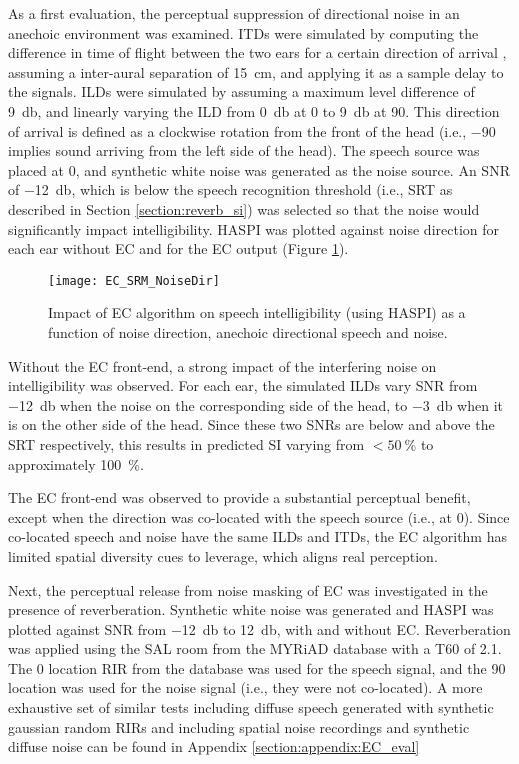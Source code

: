 As a first evaluation, the perceptual suppression of directional noise in an anechoic environment was examined. ITDs were simulated by computing the difference in time of flight between the two ears for a certain direction of arrival , assuming a inter-aural separation of \qty{15}{\centi\metre}, and applying it as a sample delay to the signals. ILDs were simulated by assuming a maximum level difference of \qty{9}{\decibel}, and linearly varying the ILD from \qty{0}{\decibel} at \qty{0}{\deg} to \qty{9}{\decibel} at \qty{90}{\deg}. This direction of arrival is defined as a clockwise rotation from the front of the head (i.e., \qty{-90}{\deg} implies sound arriving from the left side of the head). The speech source was placed at \qty{0}{\deg}, and synthetic white noise was generated as the noise source. An SNR of \qty{-12}{\decibel}, which is below the speech recognition threshold (i.e., SRT as described in Section \ref{section:reverb_si}) was selected so that the noise would significantly impact intelligibility. HASPI was plotted against noise direction for each ear without EC and for the EC output (Figure \ref{fig:EC_SRM_NoiseDir}).

\begin{figure}[H]
	\texttt{[image: EC\_SRM\_NoiseDir]}
	\centering
	\caption[EC spatial release from masking performance for various noise direction-of-arrival]{Impact of EC algorithm on speech intelligibility (using HASPI) as a function of noise direction, anechoic directional speech and noise.}
	\label{fig:EC_SRM_NoiseDir}
\end{figure}

Without the EC front-end, a strong impact of the interfering noise on intelligibility was observed. For each ear, the simulated ILDs vary SNR from \qty{-12}{\decibel} when the noise on the corresponding side of the head, to \qty{-3}{\decibel} when it is on the other side of the head. Since these two SNRs are below and above the SRT respectively, this results in predicted SI varying from $< \qty{50}{\percent}$ to approximately \qty{100}{\percent}.

The EC front-end was observed to provide a substantial perceptual benefit, except when the direction was co-located with the speech source (i.e., at \qty{0}{\deg}). Since co-located speech and noise have the same ILDs and ITDs, the EC algorithm has limited spatial diversity cues to leverage, which aligns real perception.

Next, the perceptual release from noise masking of EC was investigated in the presence of reverberation. Synthetic white noise was generated and HASPI was plotted against SNR from \qty{-12}{\decibel} to \qty{12}{\decibel}, with and without EC. Reverberation was applied using the SAL room from the MYRiAD database with a T60 of \qty{2.1}{\sec}. The \qty{0}{\deg} location RIR from the database was used for the speech signal, and the \qty{90}{\deg} location was used for the noise signal (i.e., they were not co-located). A more exhaustive set of similar tests including diffuse speech generated with synthetic gaussian random RIRs and including spatial noise recordings and synthetic diffuse noise can be found in Appendix \ref{section:appendix:EC_eval}


